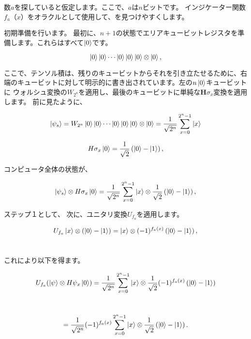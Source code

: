 数$a$を探していると仮定します。ここで、$a$は$n$ビットです。 インジケーター関数$f_a（x）$をオラクルとして使用して、を見つけやすくします。

初期準備を行います。 最初に、$n + 1$の状態でエリアキュービットレジスタを準備します。これらはすべて$\ket{0}$です。

\begin{equation}
\label{75}
\ket{0}\ket{0} \cdots \ket{0}\ket{0}\ket{0} \otimes \ket{0},
\end{equation}

ここで、テンソル積は、残りのキュービットからそれを引き立たせるために、右端のキュービットに対して明示的に書き出されています。左の$n \ket{0}$キュービットに ウォルシュ変換の$W_{2^n}$を適用し、最後のキュービットに単純な$\mathbf{H} \sigma_x$変換を適用します。 前に見たように、

\begin{equation}
\label{76}
\ket{ \psi_s} =
W_{2^n} \ket{0}\ket{0} \cdots \ket{0}\ket{0}\ket{0} \otimes \ket{0}
=\frac{1}{\sqrt{2^n}} \sum_{x=0}^{2^n -1} \ket{x}
\end{equation}

\begin{equation}
\label{77}
H \sigma_x \ket{0} 
=
\frac{1}{\sqrt{2}} \left(  \ket{0} - \ket{1} \right),
\end{equation}

コンピュータ全体の状態が、

\begin{equation}
\label{78}
\ket{\psi_s} \otimes H \sigma_x \ket{0}
=
\frac{1}{\sqrt{2^n}}  \sum_{x=0}^{2^n-1} \ket{x} \otimes \frac{1}{\sqrt{2}}  \left(  \ket{0} - \ket{1} \right),
\end{equation}

ステップ１として、 次に、ユニタリ変換$U_{f_a}$を適用します。

\begin{equation}
\label{79}
U_{f_a} \ket{x} \otimes \left( \ket{0}  - \ket{1} \right)
=
\ket{x} \otimes (-1) ^{f_a (x)}  \left( \ket{0}  - \ket{1} \right),
\end{equation}　

これにより以下を得ます。

\begin{equation}
\label{80}
U_{f_a} ( \ket{\psi} \otimes H \psi_x \ket{0} )
=
\frac{1}{\sqrt{2^n}}  \sum_{x=0}^{2^n-1} \ket{x} \otimes \frac{1}{\sqrt{2}} (-1)^{f_a (x)} \left(  \ket{0} - \ket{1} \right) 
\end{equation}　

\begin{equation}
\label{81}
=
\frac{1}{\sqrt{2^n}} (-1)^{f_a (x)}   \sum_{x=0}^{2^n-1} \ket{x} \otimes \frac{1}{\sqrt{2}} \left(  \ket{0} - \ket{1} \right).
\end{equation}　

